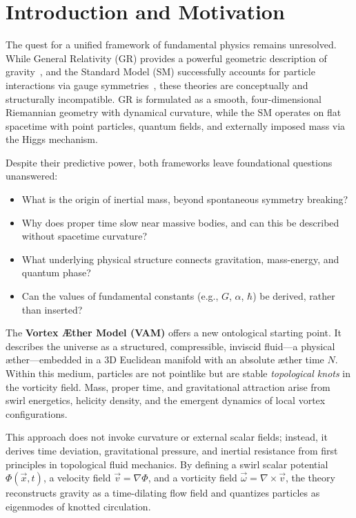 \documentclass[preprint]{revtex4-2}
\begin{document}
\newpage
\begingroup
\setlength{\baselineskip}{0.9\baselineskip}  %
\tableofcontents
\endgroup
\vspace{1em}
\newpage
\section{Introduction and Motivation}\label{sec:introduction-and-motivation}
    The quest for a unified framework of fundamental physics remains unresolved. While General Relativity (GR) provides a powerful geometric description of gravity~\cite{einstein1915gr}, and the Standard Model (SM) successfully accounts for particle interactions via gauge symmetries~\cite{weinberg1995quantum}, these theories are conceptually and structurally incompatible. GR is formulated as a smooth, four-dimensional Riemannian geometry with dynamical curvature, while the SM operates on flat spacetime with point particles, quantum fields, and externally imposed mass via the Higgs mechanism.

    Despite their predictive power, both frameworks leave foundational questions unanswered:
    \begin{itemize}
        \item What is the origin of inertial mass, beyond spontaneous symmetry breaking?
        \item Why does proper time slow near massive bodies, and can this be described without spacetime curvature?
        \item What underlying physical structure connects gravitation, mass-energy, and quantum phase?
        \item Can the values of fundamental constants (e.g., $G$, $\alpha$, $\hbar$) be derived, rather than inserted?
    \end{itemize}

    The \textbf{Vortex \AE ther Model (VAM)} offers a new ontological starting point. It describes the universe as a structured, compressible, inviscid fluid---a physical \ae ther---embedded in a 3D Euclidean manifold with an absolute æther time $N$. Within this medium, particles are not pointlike but are stable \textit{topological knots} in the vorticity field. Mass, proper time, and gravitational attraction arise from swirl energetics, helicity density, and the emergent dynamics of local vortex configurations.

    This approach does not invoke curvature or external scalar fields; instead, it derives time deviation, gravitational pressure, and inertial resistance from first principles in topological fluid mechanics. By defining a swirl scalar potential $\Phi(\vec{x},t)$, a velocity field $\vec{v} = \nabla \Phi$, and a vorticity field $\vec{\omega} = \nabla \times \vec{v}$, the theory reconstructs gravity as a time-dilating flow field and quantizes particles as eigenmodes of knotted circulation.
\end{document}
